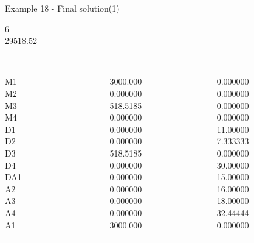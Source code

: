 \begin{frame}{Example 18 - Final solution(1)}

 6 \\
  29518.52\\

\begin{columns}[t]
\begin{column}{0.3\textwidth}
\\
M1\\
M2\\
M3\\
M4\\
D1\\
D2\\
D3\\
D4\\
DA1\\
A2\\
A3\\
A4\\
A1\\
-----------\\

\end{column}
\begin{column}{0.3\textwidth}
\\
3000.000\\
0.000000\\
518.5185\\
0.000000\\
0.000000\\
0.000000\\
518.5185\\
0.000000\\
0.000000\\
0.000000\\
0.000000\\
0.000000\\
3000.000\\
\end{column}

\begin{column}{0.3\textwidth}
\\
0.000000\\
0.000000\\
0.000000\\
0.000000\\
11.00000\\
7.333333\\
0.000000\\
30.00000\\
15.00000\\
16.00000\\
18.00000\\
32.44444\\
0.000000\\
\end{column}
\end{columns}
\end{frame}

